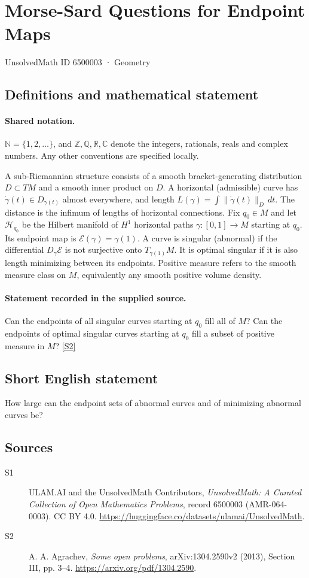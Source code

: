 \documentclass[11pt]{article}
\newcommand{\sref}[2]{\hyperlink{source:#1:#2}{[S#2]}}
\begin{document}
\setcounter{section}{6500002}
\section{Morse-Sard Questions for Endpoint Maps}\label{6500003}
{\small\sffamily UnsolvedMath ID 6500003 · Geometry}
\subsection{Definitions and mathematical statement}

\paragraph{Shared notation.}$\mathbb N=\{1,2,\ldots\}$, and $\mathbb Z,\mathbb Q,\mathbb R,\mathbb C$ denote the integers, rationals, reals and complex numbers. Any other conventions are specified locally.


A sub-Riemannian structure consists of a smooth bracket-generating distribution $D\subset TM$ and a smooth inner product on $D$. A horizontal (admissible) curve has $\dot\gamma(t)\in D_{\gamma(t)}$ almost everywhere, and length $L(\gamma)=\int\|\dot\gamma(t)\|_D\,dt$. The distance is the infimum of lengths of horizontal connections. Fix $q_0\in M$ and let $\mathcal H_{q_0}$ be the Hilbert manifold of $H^1$ horizontal paths $\gamma:[0,1]\to M$ starting at $q_0$. Its endpoint map is $\mathcal E(\gamma)=\gamma(1)$. A curve is singular (abnormal) if the differential $D_\gamma\mathcal E$ is not surjective onto $T_{\gamma(1)}M$. It is optimal singular if it is also length minimizing between its endpoints. Positive measure refers to the smooth measure class on $M$, equivalently any smooth positive volume density.
\paragraph{Statement recorded in the supplied source.}
Can the endpoints of all singular curves starting at $q_0$ fill all of $M$? Can the endpoints of optimal singular curves starting at $q_0$ fill a subset of positive measure in $M$? \sref{6500003}{2}
\subsection{Short English statement}
How large can the endpoint sets of abnormal curves and of minimizing abnormal curves be?
\subsection{Sources}
\begin{description}
\item[\hypertarget{source:6500003:1}{S1}] ULAM.AI and the UnsolvedMath Contributors, \emph{UnsolvedMath: A Curated Collection of Open Mathematics Problems}, record 6500003 (AMR-064-0003). CC BY 4.0. \url{https://huggingface.co/datasets/ulamai/UnsolvedMath}.
\item[\hypertarget{source:6500003:2}{S2}] A. A. Agrachev, \emph{Some open problems}, arXiv:1304.2590v2 (2013), Section III, pp. 3--4. \url{https://arxiv.org/pdf/1304.2590}.
\end{description}
\label{end:6500003}
\end{document}

